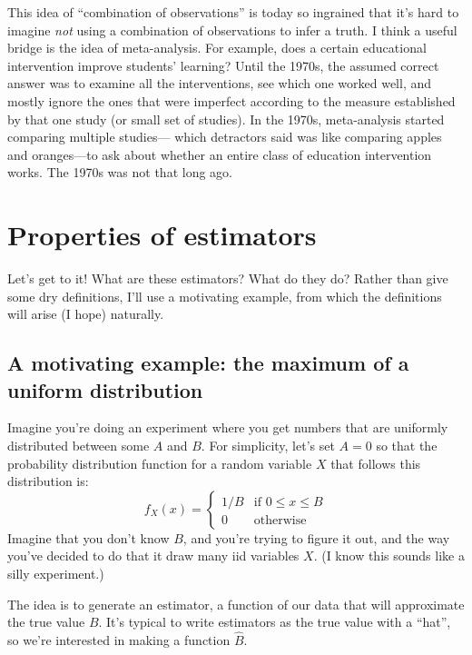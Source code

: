 This idea of ``combination of observations'' is today so ingrained that it's
hard to imagine \emph{not} using a combination of observations to infer a
truth. I think a useful bridge is the idea of meta-analysis. For example, does
a certain educational intervention improve students' learning? Until the
1970s, the assumed correct answer was to examine all the interventions, see
which one worked well, and mostly ignore the ones that were imperfect
according to the measure established by that one study (or small set of
studies). In the 1970s, meta-analysis started comparing multiple studies---
which detractors said was like comparing apples and oranges---to ask about
whether an entire class of education intervention works. The 1970s was not
that long ago.


\section{Properties of estimators}

Let's get to it! What are these estimators? What do they do? Rather than give
some dry definitions, I'll use a motivating example, from which the
definitions will arise (I hope) naturally.

\subsection{A motivating example: the maximum of a uniform distribution}

Imagine you're doing an experiment where you get numbers that are uniformly
distributed between some $A$ and $B$. For simplicity, let's set $A=0$ so that
the probability distribution function for a random variable $X$ that follows
this distribution is:
\begin{equation}\label{eq:uniform_pdf}
f_X(x) = \begin{cases}
  1/B &\text{if $0 \leq x \leq B$} \\
  0 &\text{otherwise}
\end{cases}
\end{equation}
Imagine that you don't know $B$, and you're trying to figure it out, and the
way you've decided to do that it draw many iid variables $X$. (I know this sounds
like a silly experiment.)

The idea is to generate an estimator, a function of our data that will
approximate the true value $B$. It's typical to write estimators as the
true value with a ``hat'', so we're interested in making a function $\hat{B}$.

